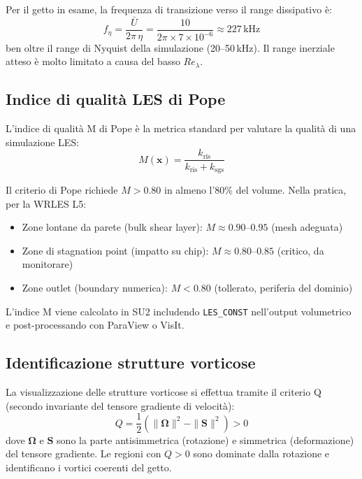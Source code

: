 \documentclass[11pt,a4paper]{article}
\newcommand{\ttcfg}[1]{\texttt{\color{codegray}#1}}
\begin{document}
Per il getto in esame, la frequenza di transizione verso il range dissipativo è:
\begin{equation}
  f_\eta = \frac{\bar{U}}{2\pi\,\eta}
  = \frac{10}{2\pi \times 7\times10^{-6}}
  \approx 227\,\text{kHz}
\end{equation}
ben oltre il range di Nyquist della simulazione (20--50\,kHz). Il range inerziale atteso è molto limitato a causa del basso $Re_\lambda$.

\subsection{Indice di qualità LES di Pope}

L'indice di qualità M di Pope \cite{Pope2000} è la metrica standard per valutare la qualità di una simulazione LES:
\begin{equation}
  M(\mathbf{x}) = \frac{k_{\mathrm{ris}}}{k_{\mathrm{ris}} + k_{\mathrm{sgs}}}
\end{equation}

Il criterio di Pope richiede $M > 0.80$ in almeno l'80\% del volume. Nella pratica, per la WRLES L5:
\begin{itemize}
  \item Zone lontane da parete (bulk shear layer): $M \approx 0.90$--$0.95$ (mesh adeguata)
  \item Zone di stagnation point (impatto su chip): $M \approx 0.80$--$0.85$ (critico, da monitorare)
  \item Zone outlet (boundary numerica): $M < 0.80$ (tollerato, periferia del dominio)
\end{itemize}

L'indice M viene calcolato in SU2 includendo \ttcfg{LES\_CONST} nell'output volumetrico e post-processando con ParaView o VisIt.

\subsection{Identificazione strutture vorticose}

La visualizzazione delle strutture vorticose si effettua tramite il criterio Q (secondo invariante del tensore gradiente di velocità):
\begin{equation}
  Q = \frac{1}{2}\left(\|\boldsymbol{\Omega}\|^2 - \|\mathbf{S}\|^2\right) > 0
\end{equation}
dove $\boldsymbol{\Omega}$ e $\mathbf{S}$ sono la parte antisimmetrica (rotazione) e simmetrica (deformazione) del tensore gradiente. Le regioni con $Q > 0$ sono dominate dalla rotazione e identificano i vortici coerenti del getto.
\end{document}
